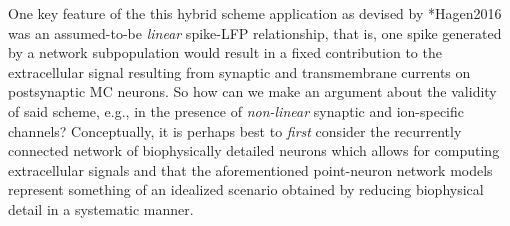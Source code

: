 One key feature of the this hybrid scheme application as devised by \citeasnoun**{Hagen2016} was an assumed-to-be \emph{linear} spike-LFP relationship, that is, 
one spike generated by a  network subpopulation would result in a fixed  contribution 
to the extracellular signal resulting from synaptic and transmembrane currents on postsynaptic MC neurons.
So how can we make an argument about the validity of said scheme,
e.g., in the presence of \emph{non-linear} synaptic and ion-specific channels?
Conceptually, it is perhaps best to \emph{first} consider the recurrently connected network of biophysically detailed neurons which allows for computing extracellular signals 
and that the aforementioned point-neuron network models represent something of an idealized scenario obtained by reducing biophysical detail in a systematic manner.

